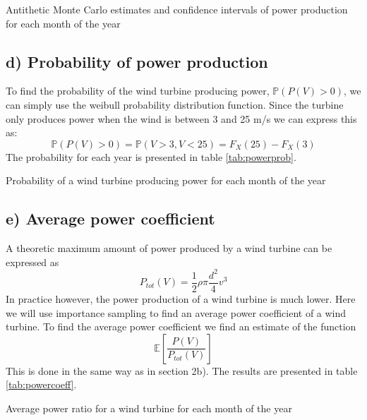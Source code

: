 \documentclass[a4paper]{article}
\begin{document}
\begin{table}[H]
    \centering
    \caption{Antithetic Monte Carlo estimates and confidence intervals of power production for each month of the year}
    \label{tab:ATresults}
    
\end{table}

\subsection*{d) Probability of power production}
To find the probability of the wind turbine producing power, $\mathbb{P}(P(V) > 0)$, we can simply use the weibull probability distribution function. Since the turbine only produces power when the wind is between 3 and 25 m/s we can express this as:
\begin{equation}
    \mathbb{P}(P(V) > 0) = \mathbb{P}(V > 3, V < 25) = F_X(25) - F_X(3)
\end{equation}
The probability for each year is presented in table \ref{tab:powerprob}.

\begin{table}[H]
    \centering
    \caption{Probability of a wind turbine producing power for each month of the year}
    \label{tab:powerprob}
    
\end{table}

\subsection*{e) Average power coefficient}
A theoretic maximum amount of power produced by a wind turbine can be expressed as
\begin{equation}
    P_{tot}(V) = \frac{1}{2}\rho\pi\frac{d^2}{4}v^3
\end{equation}
In practice however, the power production of a wind turbine is much lower. Here we will use importance sampling to find an average power coefficient of a wind turbine. To find the average power coefficient we find an estimate of the function
\begin{equation}
  \mathbb{E}[\frac{P(V)}{P_{tot}(V)}]
\end{equation}
This is done in the same way as in section 2b). The results are presented in table \ref{tab:powercoeff}.
\begin{table}[H]
    \centering
    \caption{Average power ratio for a wind turbine for each month of the year}
    \label{tab:powercoeff}
    
\end{table}
\end{document}
